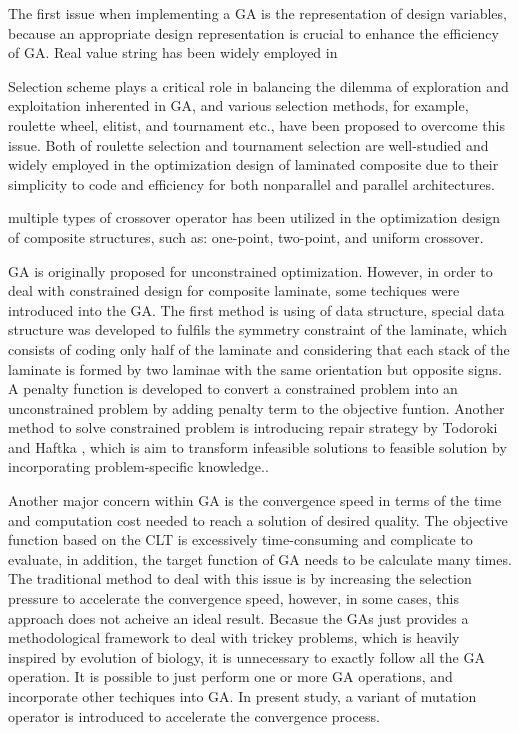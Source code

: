 The first issue when implementing a GA is the representation of design variables, because an
appropriate design representation is crucial to enhance the efficiency of GA. Real value string has
been widely employed in 

Selection scheme plays a critical role in balancing the dilemma of exploration and exploitation
inherented in GA, and various selection methods, for example, roulette wheel, elitist, and tournament
etc., have been proposed to overcome this issue. Both of roulette selection and tournament selection
are well-studied and widely employed in the optimization design of laminated composite due to their
simplicity to code and efficiency for both nonparallel and parallel architectures.


multiple types of crossover operator has been utilized in the optimization design of composite
structures, such as: one-point, two-point, and uniform crossover.



GA is originally proposed for unconstrained optimization. However, in order to deal with constrained
design for composite laminate, some techiques were introduced into the GA. The first method is using
of data structure, special data structure was developed to fulfils the symmetry constraint of the
laminate, which consists of coding only half of the laminate and considering that each stack of the
laminate is formed by two laminae with the same orientation but opposite
signs\cite{le1995improved,kogiso1994design}. A penalty function is developed to convert a constrained
problem into an unconstrained problem by adding penalty term to the objective funtion. Another
method to solve constrained problem is introducing repair strategy by Todoroki and Haftka
\cite{todoroki1998stacking}, which is aim to transform infeasible solutions to feasible solution by
incorporating problem-specific knowledge.. 

Another major concern within GA is the convergence speed in terms of the time
and computation cost needed to reach a solution of desired quality. The
objective function based on the CLT is excessively time-consuming and complicate
to evaluate, in addition, the target function of GA  needs to be calculate many
times. The traditional method to deal with this issue is by increasing the
selection pressure to accelerate the convergence speed, however, in some cases,
this approach does not acheive an ideal result. Becasue the GAs just provides a
methodological framework to deal with trickey problems, which is heavily
inspired by evolution of biology, it is unnecessary to exactly follow all the
GA operation. It is possible to just perform one or more GA operations, and
incorporate other techiques into GA. In present study, a variant of mutation
operator is introduced to accelerate the convergence process.
  

